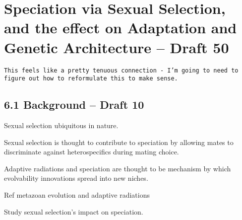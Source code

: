 \section{Speciation via Sexual Selection, and the effect on Adaptation and Genetic Architecture – Draft 50}

\verb|This feels like a pretty tenuous connection - I’m going to need to figure out how to reformulate this to make sense.|

\subsection{6.1 Background – Draft 10}

Sexual selection ubiquitous in nature.

Sexual selection is thought to contribute to speciation by allowing mates to discriminate against heterospecifics during mating choice.

Adaptive radiations and speciation are thought to be mechanism by which evolvability innovations spread into new niches.

Ref metazoan evolution and adaptive radiations

Study sexual selection’s impact on speciation.